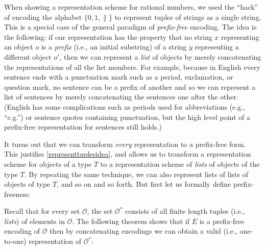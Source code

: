 When showing a representation scheme for rational numbers, we used the
``hack'' of encoding the alphabet \(\{ 0,1, \|\}\) to represent tuples
of strings as a single string. This is a special case of the general
paradigm of \emph{prefix-free} encoding. The idea is the following: if
our representation has the property that no string \(x\) representing an
object \(o\) is a \emph{prefix} (i.e., an initial substring) of a string
\(y\) representing a different object \(o'\), then we can represent a
\emph{list} of objects by merely concatenating the representations of
all the list members. For example, because in English every sentence
ends with a punctuation mark such as a period, exclamation, or question
mark, no sentence can be a prefix of another and so we can represent a
list of sentences by merely concatenating the sentences one after the
other. (English has some complications such as periods used for
abbreviations (e.g., ``e.g.'') or sentence quotes containing
punctuation, but the high level point of a prefix-free representation
for sentences still holds.)

It turns out that we can transform \emph{every} representation to a
prefix-free form. This justifies \cref{representtuplesidea}, and allows
us to transform a representation scheme for objects of a type \(T\) to a
representation scheme of \emph{lists} of objects of the type \(T\). By
repeating the same technique, we can also represent lists of lists of
objects of type \(T\), and so on and so forth. But first let us formally
define prefix-freeness:

\hypertarget{prefixfreedef}{}

Recall that for every set \(\mathcal{O}\), the set \(\mathcal{O}^*\)
consists of all finite length tuples (i.e., \emph{lists}) of elements in
\(\mathcal{O}\). The following theorem shows that if \(E\) is a
prefix-free encoding of \(\mathcal{O}\) then by concatenating encodings
we can obtain a valid (i.e., one-to-one) representation of
\(\mathcal{O}^*\):

